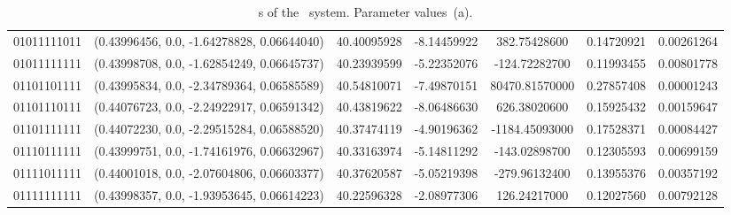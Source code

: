 \begin{table}
\begin{tabular}{c|c|c|c|c|c|c}
 	01011111011 & (0.43996456,   0.0, -1.64278828, 0.06644040) & 40.40095928 & -8.14459922 & 382.75428600 &0.14720921 &0.00261264 \\
 	01011111111 & (0.43998708,   0.0, -1.62854249, 0.06645737) & 40.23939599 & -5.22352076 & -124.72282700 &0.11993455 &0.00801778 \\
 	01101101111 & (0.43995834,   0.0, -2.34789364, 0.06585589) & 40.54810071 & -7.49870151 & 80470.81570000 &0.27857408 &0.00001243 \\
 	01101110111 & (0.44076723,   0.0, -2.24922917, 0.06591342) & 40.43819622 & -8.06486630 & 626.38020600 &0.15925432 &0.00159647 \\
 	01101111111 & (0.44072230,   0.0, -2.29515284, 0.06588520) & 40.37474119 & -4.90196362 & -1184.45093000 &0.17528371 &0.00084427 \\
 	01110111111 & (0.43999751,   0.0, -1.74161976, 0.06632967) & 40.33163974 & -5.14811292 & -143.02898700 &0.12305593 &0.00699159 \\
 	01111011111 & (0.44001018,   0.0, -2.07604806, 0.06603377) & 40.37620587 & -5.05219398 & -279.96132400 &0.13955376 &0.00357192 \\
 	01111111111 & (0.43998357,   0.0, -1.93953645, 0.06614223) & 40.22596328 & -2.08977306 & 126.24217000 &0.12027560 &0.00792128 \\
 	\end{tabular}
	\caption{\rpo s of the \twomode\ system. Parameter values \,(a).}
	\label{t-rpo2modeupto8}
\end{table}
